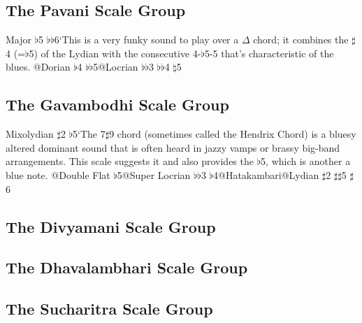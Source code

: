 \documentclass[english]{./gbook}
\begin{document}
\begin{large}
\subsection{The Pavani Scale Group}
Major $\flat$5 $\flat\flat$6`This is a very funky sound to play over a $\Delta$ chord; it combines the $\sharp$4 (=$\flat$5) of the Lydian with the consecutive 4-$\flat$5-5 that's characteristic of the blues.
@Dorian $\flat$4 $\flat\flat$5@Locrian $\flat\flat$3 $\flat\flat$4 $\natural$5%


\subsection{The Gavambodhi Scale Group}
Mixolydian $\sharp$2 $\flat$5`The 7$\sharp$9 chord (sometimes called the Hendrix Chord) is a bluesy altered dominant sound that is often heard in jazzy vamps or brassy big-band arrangements. This scale suggests it and also provides the $\flat$5, which is another a blue note.
@Double Flat $\flat$5@Super Locrian $\flat\flat$3 $\flat$4@Hatakambari@Lydian $\sharp$2 $\sharp\sharp$5 $\sharp$6%

\subsection{The Divyamani Scale Group}

\subsection{The Dhavalambhari Scale Group}

\subsection{The Sucharitra Scale Group}


\end{large}
\end{document}
